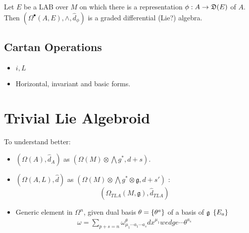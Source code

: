 \begin{theorem}
Let $E$ be a LAB over $M$ on which there is a representation $\phi: A \to \alg D(E)$ of $A$. Then $(\Omega^\bullet(A, E), \wedge, \hat d_\phi)$ is a graded differential (Lie?) algebra.
\end{theorem}

\subsection{Cartan Operations}

\begin{itemize}

\item $i, L$

\item Horizontal, invariant and basic forms.

\end{itemize}

\section{Trivial Lie Algebroid}

To understand better:
\begin{itemize}
    
\item $(\Omega(A), \hat d_A)$ as $(\Omega(M)\otimes \bigwedge g^*, d + s)$.

\item $(\Omega(A, L), \hat d)$ as $(\Omega(M)\otimes \bigwedge g^* \otimes \mathfrak g, d + s')$ : \[(\Omega_{TLA}(M, \mathfrak g), \hat d_{TLA})\]

\item Generic element in $\Omega^n$, given dual basis $\theta = \left\{ \theta^a \right\}$ of a basis of $\mathfrak{g}$ $\left\{ E_a \right\}$
\begin{align*}
    \omega = \sum_{p + s = n} \omega^\theta_{\mu_1 \cdots a_1 \cdots a_s} dx^{\mu_1} wedge \cdots \theta^{a_s}
\end{align*}
    
\end{itemize}

